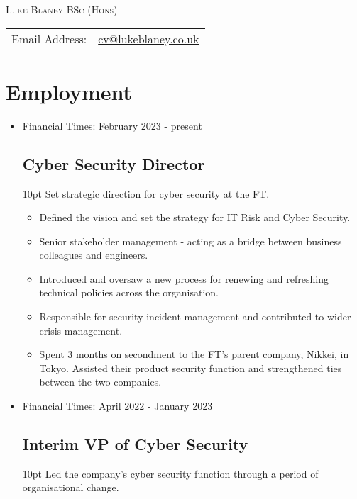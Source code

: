 \documentclass[a4paper]{article}
\newenvironment{detail}{\begin{adjustwidth}{10pt}{}}{\end{adjustwidth}}
\begin{document}
\begin{center}\textsc{\LARGE Luke Blaney BSc (Hons)}\end{center}

\begin{tabular}{ l l }

Email Address: & \href{mailto:cv@lukeblaney.co.uk}{cv@lukeblaney.co.uk}\\

\end{tabular}

\section*{Employment}

\begin{itemize}


\item Financial Times: February 2023 - present
\subsection*{Cyber Security Director}
\begin{detail}
Set strategic direction for cyber security at the FT.

\begin{itemize}
	\item Defined the vision and set the strategy for IT Risk and Cyber Security.
	\item Senior stakeholder management - acting as a bridge between business colleagues and engineers.
	\item Introduced and oversaw a new process for renewing and refreshing technical policies across the organisation.
	\item Responsible for security incident management and contributed to wider crisis management.
	\item Spent 3 months on secondment to the FT's parent company, Nikkei, in Tokyo.  Assisted their product security function and strengthened ties between the two companies.
\end{itemize}
\end{detail}

\item Financial Times: April 2022 - January 2023
\subsection*{Interim VP of Cyber Security}
\begin{detail}
Led the company's cyber security function through a period of organisational change.


\end{detail}
\end{itemize}
\end{document}
